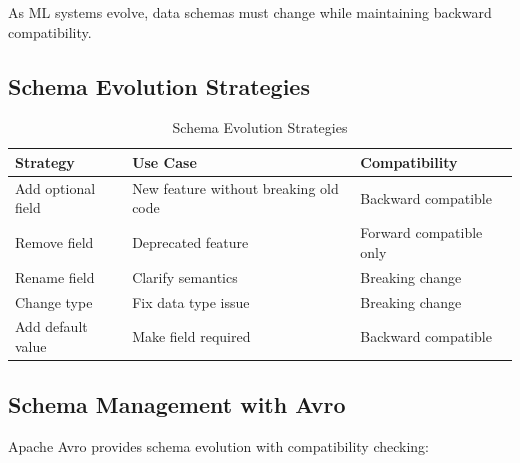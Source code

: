 As ML systems evolve, data schemas must change while maintaining backward compatibility.

\subsection{Schema Evolution Strategies}

\begin{table}[h]
\centering
\caption{Schema Evolution Strategies}
\label{tab:schema_evolution}
\begin{tabular}{@{}lp{5cm}p{5cm}@{}}
\toprule
\textbf{Strategy} & \textbf{Use Case} & \textbf{Compatibility} \\
\midrule
Add optional field & New feature without breaking old code & Backward compatible \\
Remove field & Deprecated feature & Forward compatible only \\
Rename field & Clarify semantics & Breaking change \\
Change type & Fix data type issue & Breaking change \\
Add default value & Make field required & Backward compatible \\
\bottomrule
\end{tabular}
\end{table}

\subsection{Schema Management with Avro}

Apache Avro provides schema evolution with compatibility checking:

